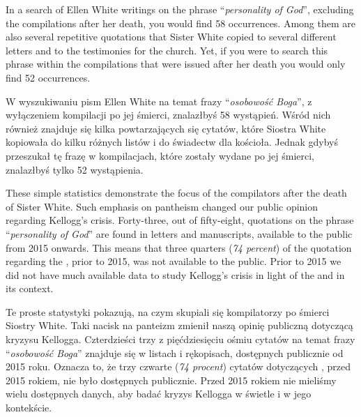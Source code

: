 In a search of Ellen White writings on the phrase “\textit{personality of God}”, excluding the compilations after her death, you would find 58 occurrences. Among them are also several repetitive quotations that Sister White copied to several different letters and to the testimonies for the church. Yet, if you were to search this phrase within the compilations that were issued after her death you would only find 52 occurrences.


W wyszukiwaniu pism Ellen White na temat frazy “\textit{osobowość Boga}”, z wyłączeniem kompilacji po jej śmierci, znalazłbyś 58 wystąpień. Wśród nich również znajduje się kilka powtarzających się cytatów, które Siostra White kopiowała do kilku różnych listów i do świadectw dla kościoła. Jednak gdybyś przeszukał tę frazę w kompilacjach, które zostały wydane po jej śmierci, znalazłbyś tylko 52 wystąpienia.


These simple statistics demonstrate the focus of the compilators after the death of Sister White. Such emphasis on pantheism changed our public opinion regarding Kellogg’s crisis. Forty-three, out of fifty-eight, quotations on the phrase “\textit{personality of God}” are found in letters and manuscripts, available to the public from 2015 onwards. This means that three quarters (\textit{74 percent}) of the quotation regarding the , prior to 2015, was not available to the public. Prior to 2015 we did not have much available data to study Kellogg's crisis in light of the  and in its context.


Te proste statystyki pokazują, na czym skupiali się kompilatorzy po śmierci Siostry White. Taki nacisk na panteizm zmienił naszą opinię publiczną dotyczącą kryzysu Kellogga. Czterdzieści trzy z pięćdziesięciu ośmiu cytatów na temat frazy “\textit{osobowość Boga}” znajduje się w listach i rękopisach, dostępnych publicznie od 2015 roku. Oznacza to, że trzy czwarte (\textit{74 procent}) cytatów dotyczących , przed 2015 rokiem, nie było dostępnych publicznie. Przed 2015 rokiem nie mieliśmy wielu dostępnych danych, aby badać kryzys Kellogga w świetle  i w jego kontekście.




% 